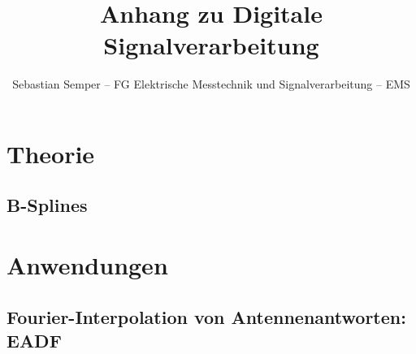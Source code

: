 \documentclass[ngerman]{article}
\title{Anhang zu Digitale Signalverarbeitung}
\author{Sebastian Semper -- FG Elektrische Messtechnik und Signalverarbeitung -- EMS}
\begin{document}

%
%
\section{Theorie}
%
%
\subsection{B-Splines}\label{b-splines}
%

%
%
\section{Anwendungen}
%
%
\subsection{Fourier-Interpolation von Antennenantworten: EADF}\label{eadf-interpol}
%

%
%
%

\end{document}
